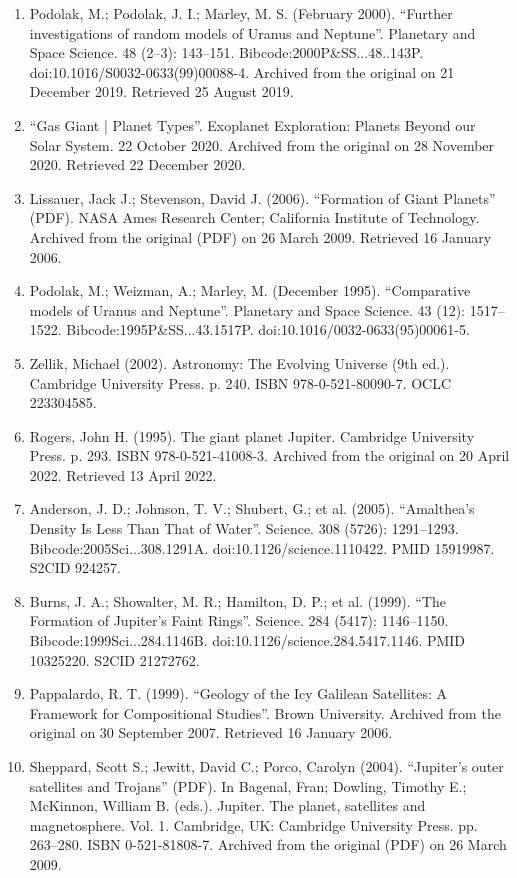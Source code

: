 \begin{enumerate}
\item Podolak, M.; Podolak, J. I.; Marley, M. S. (February 2000). ``Further investigations of random models of Uranus and Neptune''. Planetary and Space Science. 48 (2–3): 143–151. Bibcode:2000P\&SS...48..143P. doi:10.1016/S0032-0633(99)00088-4. Archived from the original on 21 December 2019. Retrieved 25 August 2019.
\item ``Gas Giant | Planet Types''. Exoplanet Exploration: Planets Beyond our Solar System. 22 October 2020. Archived from the original on 28 November 2020. Retrieved 22 December 2020.
\item Lissauer, Jack J.; Stevenson, David J. (2006). ``Formation of Giant Planets'' (PDF). NASA Ames Research Center; California Institute of Technology. Archived from the original (PDF) on 26 March 2009. Retrieved 16 January 2006.
\item Podolak, M.; Weizman, A.; Marley, M. (December 1995). ``Comparative models of Uranus and Neptune''. Planetary and Space Science. 43 (12): 1517–1522. Bibcode:1995P\&SS...43.1517P. doi:10.1016/0032-0633(95)00061-5.
\item Zellik, Michael (2002). Astronomy: The Evolving Universe (9th ed.). Cambridge University Press. p. 240. ISBN 978-0-521-80090-7. OCLC 223304585.
\item Rogers, John H. (1995). The giant planet Jupiter. Cambridge University Press. p. 293. ISBN 978-0-521-41008-3. Archived from the original on 20 April 2022. Retrieved 13 April 2022.
\item Anderson, J. D.; Johnson, T. V.; Shubert, G.; et al. (2005). ``Amalthea's Density Is Less Than That of Water''. Science. 308 (5726): 1291–1293. Bibcode:2005Sci...308.1291A. doi:10.1126/science.1110422. PMID 15919987. S2CID 924257.
\item Burns, J. A.; Showalter, M. R.; Hamilton, D. P.; et al. (1999). ``The Formation of Jupiter's Faint Rings''. Science. 284 (5417): 1146–1150. Bibcode:1999Sci...284.1146B. doi:10.1126/science.284.5417.1146. PMID 10325220. S2CID 21272762.
\item Pappalardo, R. T. (1999). ``Geology of the Icy Galilean Satellites: A Framework for Compositional Studies''. Brown University. Archived from the original on 30 September 2007. Retrieved 16 January 2006.
\item Sheppard, Scott S.; Jewitt, David C.; Porco, Carolyn (2004). ``Jupiter's outer satellites and Trojans'' (PDF). In Bagenal, Fran; Dowling, Timothy E.; McKinnon, William B. (eds.). Jupiter. The planet, satellites and magnetosphere. Vol. 1. Cambridge, UK: Cambridge University Press. pp. 263–280. ISBN 0-521-81808-7. Archived from the original (PDF) on 26 March 2009.

\end{enumerate}
